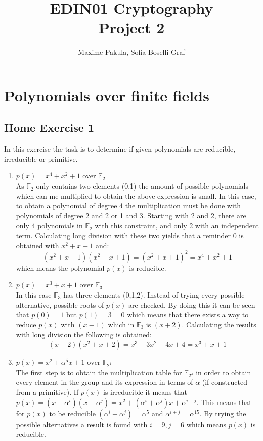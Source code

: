 \documentclass{article}
\title{EDIN01 Cryptography \\ Project 2}
\author{Maxime Pakula, Sofia Boselli Graf}
\begin{document}
\maketitle

\tableofcontents

\newpage


\section{Polynomials over finite fields}

\subsection{Home Exercise 1}
In this exercise the task is to determine if given polynomials are reducible, irreducible or primitive. 

\begin{enumerate}
    \item $p(x) = x^4 + x^2 + 1 \text{ over } \mathbb F_2$ \\
    As $\mathbb F_2$ only contains two elements (0,1) the amount of possible polynomials which can me multiplied to obtain the above expression is small. In this case, to obtain a polynomial of degree 4 the multiplication must be done with polynomials of degree 2 and 2 or 1 and 3. Starting with 2 and 2, there are only 4 polynomials in $\mathbb F_2$ with this constraint, and only 2 with an independent term. Calculating long division with these two yields that a reminder 0 is obtained with $x^2 + x + 1$ and:
    $$(x^2+x+1)(x^2-x+1) = (x^2+x+1)^2 = x^4 + x^2 + 1$$
    which means the polynomial $p(x)$ is reducible.
    \item $p(x) = x^3 + x + 1 \text{ over } \mathbb F_3$ \\
    In this case $\mathbb F_3$ has three elements (0,1,2). Instead of trying every possible alternative, possible roots of $p(x)$ are checked. By doing this it can be seen that $p(0) = 1$ but $p(1) = 3 = 0$ which means that there exists a way to reduce $p(x)$ with $(x-1)$ which in $\mathbb F_3$ is $(x+2)$. Calculating the results with long division the following is obtained:
    $$(x+2)(x^2+x+2) = x^3 + 3x^2 + 4x + 4 = x^3 + x + 1$$
    \item  $p(x) = x^2 + \alpha^5 x + 1 \text{ over } \mathbb F_{2^4}$ \\
    The first step is to obtain the multiplication table for $\mathbb F_{2^4}$ in order to obtain every element in the group and its expression in terms of $\alpha$ (if constructed from a primitive). If $p(x)$ is irreducible it means that $p(x) = (x-\alpha^i)(x-\alpha^j) = x^2 + (\alpha^i + \alpha^j)x + \alpha^{i+j}$. This means that for $p(x)$ to be reducible $(\alpha^i + \alpha^j) = \alpha^5$ and  $\alpha^{i+j} = \alpha^{15}$. By trying the possible alternatives a result is found with $i = 9, j=6$ which means $p(x)$ is reducible.
\end{enumerate} 
\end{document}
